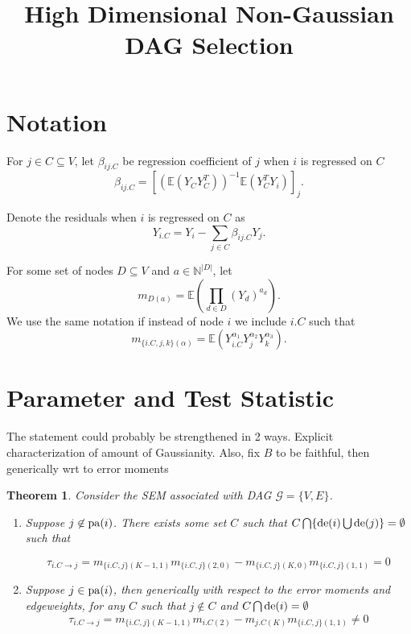 \documentclass[]{article}
\title{High Dimensional Non-Gaussian DAG Selection}
\author{}
\newtheorem{theorem}{Theorem}
\newcommand{\E}{\mathbb{E}}
\newcommand{\de}{{\rm de}}       %
\newcommand{\pa}{{\rm pa}}       %
\begin{document}
\maketitle




\section{Notation}

For $j \in C \subseteq V$, let $\beta_{ij.C}$ be regression coefficient of $j$ when $i$ is regressed on $C$
\[\beta_{ij.C} = \left[\left(\E\left(Y_{C}Y_{C}^T\right)\right)^{-1} \E(Y_{C}^T Y_i)\right]_j.\]

Denote the residuals when $i$ is regressed on $C$ as
\[Y_{i.C} = Y_i - \sum_{j \in C}\beta_{ij.C}Y_j.\]

For some set of nodes $D \subseteq V$ and $a \in \mathbb{N}^{|D|}$, let
\[m_{D(a)} = \E\left(\prod_{d \in D} (Y_d)^{a_d}\right).\]
We use the same notation if instead of node $i$ we include $i.C$ such that
\[m_{\{i.C, j, k\}(\alpha)} = \E\left(Y_{i.C}^{\alpha_1} Y_j^{\alpha_2} Y_k^{\alpha_3} \right).\]


\section{Parameter and  Test Statistic}
The statement could probably be strengthened in 2 ways. Explicit characterization of amount of Gaussianity. Also, fix $B$ to be faithful, then generically wrt to error moments
\begin{theorem}
Consider the SEM associated with DAG $\mathcal{G} = \{V, E\}$.
\begin{enumerate}
\item[(1)]
Suppose $j \not\in \pa(i)$. There exists some set $C$ such that $C \bigcap \{\de(i)\bigcup \de(j)\}= \emptyset$ such that

\[\tau _{i.C\rightarrow j} =  m_{\{i.C,j\}(K-1,1)} m_{\{i.C,j\}(2,0)} - m_{\{i.C,j\}(K,0)}m_{\{i.C,j\}(1,1)} = 0 \]

\item[(2)] Suppose $j \in \pa(i)$, then generically with respect to the error moments and edgeweights, for any $C$ such that $j \not \in C$ and $C \bigcap \de(i) = \emptyset$
\[\tau _{i.C\rightarrow j} = m_{\{i.C,j\}(K-1,1)} m_{i.C(2)} - m_{j.C(K)}m_{\{i.C,j\}(1,1)} \neq 0 \]
\end{enumerate}
\end{theorem}
\end{document}
